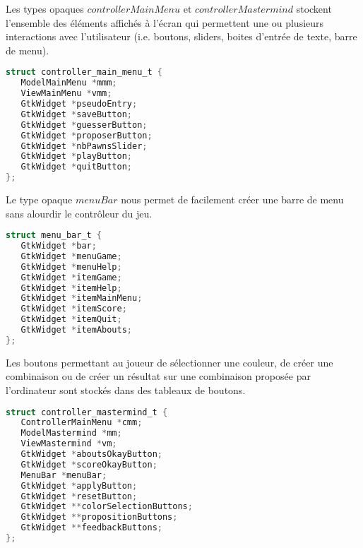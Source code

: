 Les types opaques $controllerMainMenu$ et $controllerMastermind$ stockent l'ensemble des éléments affichés à l'écran qui permettent une ou plusieurs interactions avec l'utilisateur (i.e. boutons, sliders, boites d'entrée de texte, barre de menu).

\begin{lstlisting}[language=C]
struct controller_main_menu_t {
   ModelMainMenu *mmm;
   ViewMainMenu *vmm;
   GtkWidget *pseudoEntry;
   GtkWidget *saveButton;
   GtkWidget *guesserButton;
   GtkWidget *proposerButton;
   GtkWidget *nbPawnsSlider;
   GtkWidget *playButton;
   GtkWidget *quitButton;
};
\end{lstlisting}

Le type opaque $menuBar$ nous permet de facilement créer une barre de menu sans alourdir le contrôleur du jeu. 

\begin{lstlisting}[language=C]
struct menu_bar_t {
   GtkWidget *bar;
   GtkWidget *menuGame;
   GtkWidget *menuHelp;
   GtkWidget *itemGame;
   GtkWidget *itemHelp;
   GtkWidget *itemMainMenu;
   GtkWidget *itemScore;
   GtkWidget *itemQuit;
   GtkWidget *itemAbouts;
};
\end{lstlisting}

Les boutons permettant au joueur de sélectionner une couleur, de créer une combinaison ou de créer un résultat sur une combinaison proposée par l'ordinateur sont stockés dans des tableaux de boutons. 

\begin{lstlisting}[language=C]
struct controller_mastermind_t {
   ControllerMainMenu *cmm;
   ModelMastermind *mm;
   ViewMastermind *vm;
   GtkWidget *aboutsOkayButton;
   GtkWidget *scoreOkayButton;
   MenuBar *menuBar;
   GtkWidget *applyButton;
   GtkWidget *resetButton;
   GtkWidget **colorSelectionButtons;
   GtkWidget **propositionButtons;
   GtkWidget **feedbackButtons;
};
\end{lstlisting}